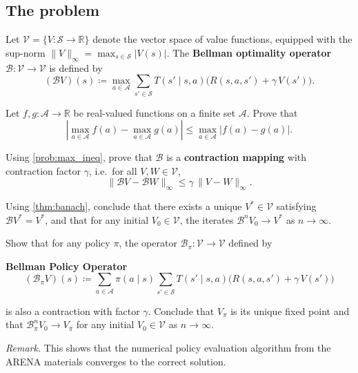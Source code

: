 \documentclass[11pt]{article}
\newcommand{\cS}{\mathcal{S}}
\newcommand{\cA}{\mathcal{A}}
\begin{document}
\subsection*{The problem}

\begin{definition}\label{def:bellman_op}
Let $\mathcal{V} = \{V : \cS \to \mathbb{R}\}$ denote the vector space of value functions, equipped with the sup-norm
$\|V\|_\infty = \max_{s \in \cS} |V(s)|$.
The \textbf{Bellman optimality operator} $\mathcal{B} : \mathcal{V} \to \mathcal{V}$ is defined by
$$
(\mathcal{B} V)(s) \coloneqq \max_{a \in \cA} \sum_{s' \in \cS} T(s' \mid s, a)\bigl(R(s,a,s') + \gamma\, V(s')\bigr).
$$
\end{definition}

\begin{exercise}
\label{prob:max_ineq} Let $f, g : \cA \to \mathbb{R}$ be real-valued functions on a finite set $\cA$. Prove that
$$
\left|\max_{a \in \cA} f(a) - \max_{a \in \cA} g(a)\right| \le \max_{a \in \cA} |f(a) - g(a)|.
$$
\end{exercise}


\begin{exercise}
\label{prob:B_contraction} Using \cref{prob:max_ineq}, prove that $\mathcal{B}$ is a \textbf{contraction mapping} with contraction factor $\gamma$, i.e.\ for all $V, W \in \mathcal{V}$,
$$
\|\mathcal{B} V - \mathcal{B} W\|_\infty \le \gamma\, \|V - W\|_\infty.
$$
\end{exercise}


\begin{exercise}
\label{prob:V_star_exists} Using \cref{thm:banach}, conclude that there exists a unique $V^* \in \mathcal{V}$ satisfying $\mathcal{B} V^* = V^*$, and that for any initial $V_0 \in \mathcal{V}$, the iterates $\mathcal{B}^n V_0 \to V^*$ as $n \to \infty$.
\end{exercise}


\begin{exercise}
\label{prob:Bpi_contraction} Show that for any policy $\pi$, the operator $\mathcal{B}_\pi : \mathcal{V} \to \mathcal{V}$ defined by
\begin{callout}[note]
\textbf{Bellman Policy Operator}
$$
(\mathcal{B}_\pi V)(s) \coloneqq \sum_{a \in \cA} \pi(a \mid s) \sum_{s' \in \cS} T(s' \mid s, a)\bigl(R(s,a,s') + \gamma\, V(s')\bigr)
$$
\end{callout}
is also a contraction with factor $\gamma$. Conclude that $V_\pi$ is its unique fixed point and that $\mathcal{B}^n_{\pi} V_0 \to V_{\pi}$ for any initial $V_0 \in \mathcal{V}$ as $n \to \infty$.

\emph{Remark.} This shows that the numerical policy evaluation algorithm from the ARENA materials converges to the correct solution.
\end{exercise}
\end{document}
